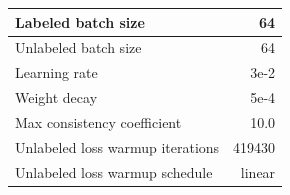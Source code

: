 \begin{tabular}{L{\WWW}  R{\RRR}}
\\ \hline
Labeled batch size & 64
\\ \hline
Unlabeled batch size & 64
\\ \hline
Learning rate & 3e-2
\\ \hline
Weight decay & 5e-4
\\ \hline
Max consistency coefficient & 10.0
\\ \hline
Unlabeled loss warmup iterations & 419430
\\ \hline
Unlabeled loss warmup schedule & linear
\end{tabular}